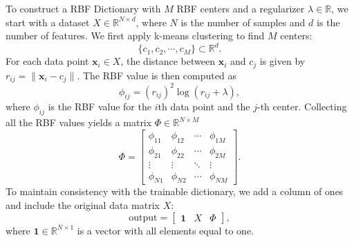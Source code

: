 To construct a RBF Dictionary
with $M$ RBF centers and a regularizer $\lambda \in \mathbb{R}$,
we start with a dataset $X \in \mathbb{R}^{N \times d}$,
where $N$ is the number of samples and
$d$ is the number of features.
We first apply k-means clustering to find $M$ centers:
\begin{equation*}
  \{c_1, c_2, \cdots, c_M\} \subset \mathbb{R}^d.
\end{equation*}
For each data point $\mathbf{x}_i \in X$,
the distance between $\mathbf{x}_i$ and $c_j$ is
given by $r_{ij} = \|\mathbf{x}_i - c_j\|$.
The RBF value is then computed as
\begin{equation*}
  \phi_{ij} = (r_{ij})^2 \log(r_{ij} + \lambda),
\end{equation*}
where $\phi_{ij}$ is the RBF value for the
$i$th data point and the $j$-th center.
Collecting all the RBF values yields a matrix $\Phi \in \mathbb{R}^{N \times M}$
\begin{equation*}
  \Phi = \left[
    \begin{array}{cccc}
      \phi_{11}&\phi_{12}&\cdots&\phi_{1M}\\
      \phi_{21}&\phi_{22}&\cdots&\phi_{2M}\\
      \vdots & \vdots & \ddots & \vdots\\
      \phi_{N1}&\phi_{N2}&\cdots&\phi_{NM}
    \end{array}
  \right].
\end{equation*}
To maintain consistency with the trainable dictionary,
we add a column of ones and
include the original data matrix $X$:
\begin{equation*}
  \text{output} = \left[
    \begin{array}{ccc}
      \mathbf{1}&X&\Phi
    \end{array}
  \right],
\end{equation*}
where $\mathbf{1} \in \mathbb{R}^{N\times 1}$ is a vector with all elements
equal to one.



